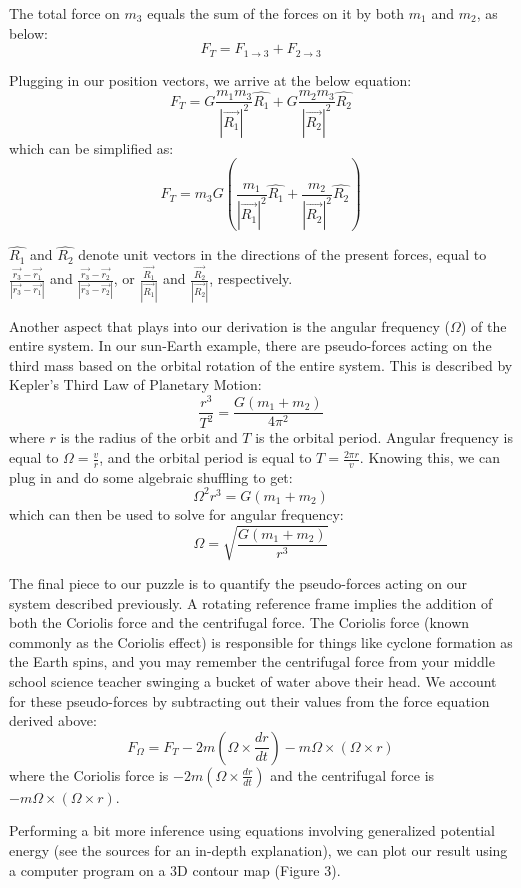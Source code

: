 The total force on $m_3$ equals the sum of the forces on it by both $m_1$ and $m_2$, as below: 
\[F_T=F_{1\rightarrow3} + F_{2\rightarrow3}\]

Plugging in our position vectors, we arrive at the below equation:
\[F_T=G\frac{m_1m_3}{|\vec{R_1}|^2}\hat{R_1}+G\frac{m_2m_3}{|\vec{R_2}|^2}\hat{R_2}\]
which can be simplified as:
\[F_T=m_3G(\frac{m_1}{|\vec{R_1}|^2}\hat{R_1}+\frac{m_2}{|\vec{R_2}|^2}\hat{R_2})\]

$\hat{R_1}$ and $\hat{R_2}$ denote unit vectors in the directions of the present forces, equal to $\frac{\vec{r_3}-\vec{r_1}}{|\vec{r_3}-\vec{r_1}|}$ and $\frac{\vec{r_3}-\vec{r_2}}{|\vec{r_3}-\vec{r_2}|}$, or $\frac{\vec{R_1}}{|\vec{R_1}|}$ and $\frac{\vec{R_2}}{|\vec{R_2}|}$, respectively. 
\newline

Another aspect that plays into our derivation is the angular frequency ($\Omega$) of the entire system. In our sun-Earth example, there are pseudo-forces acting on the third mass based on the orbital rotation of the entire system. This is described by Kepler’s Third Law of Planetary Motion:
\[\frac{r^3}{T^2}=\frac{G(m_1+m_2)}{4\pi^2}\]
where $r$ is the radius of the orbit and $T$ is the orbital period. Angular frequency is equal to $\Omega=\frac{v}{r}$, and the orbital period is equal to $T=\frac{2\pi r}{v}$. Knowing this, we can plug in and do some algebraic shuffling to get:
\[\Omega^2r^3=G(m_1+m_2)\]
which can then be used to solve for angular frequency:
\[\Omega=\sqrt{\frac{G(m_1+m_2)}{r^3}}\]

The final piece to our puzzle is to quantify the pseudo-forces acting on our system described previously. A rotating reference frame implies the addition of both the Coriolis force and the centrifugal force. The Coriolis force (known commonly as the Coriolis effect) is responsible for things like cyclone formation as the Earth spins, and you may remember the centrifugal force from your middle school science teacher swinging a bucket of water above their head. 
	We account for these pseudo-forces by subtracting out their values from the force equation derived above:
\[F_{\Omega}=F_T-2m(\Omega\times\frac{dr}{dt})-m\Omega\times(\Omega\times r)\]
where the Coriolis force is $-2m(\Omega\times\frac{dr}{dt})$ and the centrifugal force is $-m\Omega\times(\Omega\times r)$.

Performing a bit more inference using equations involving generalized potential energy (see the sources for an in-depth explanation), we can plot our result using a computer program on a 3D contour map (Figure 3).

